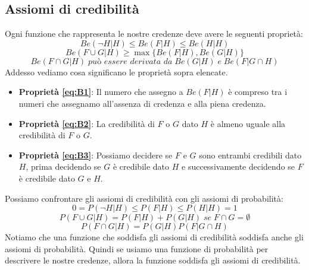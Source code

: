 \documentclass[../main.tex]{subfiles}
\begin{document}
\subsection{Assiomi di credibilità}
Ogni funzione che rappresenta le nostre credenze deve avere le seguenti proprietà:
\begin{equation}
    \label{eq:B1}
    Be(\lnot H|H) \leq Be(F|H) \leq Be(H|H)
\end{equation}
\begin{equation}
    \label{eq:B2}
    Be(F\cup G|H) \geq \max \{ Be(F|H),Be(G|H)\} 
\end{equation}
\begin{equation}
    \label{eq:B3}
    Be(F \cap G|H) \;\textit{può essere derivata da}\;  Be(G|H) \;\textit{e}\; Be(F|G \cap H)
\end{equation}
\hfill \break
Addesso vediamo cosa significano le proprietà sopra elencate.
\begin{itemize}
    \item \textbf{Proprietà \ref{eq:B1}}: Il numero che assegno a $Be(F|H)$ è compreso tra i numeri che assegnamo all'assenza di credenza e alla piena credenza.
    \item \textbf{Proprietà \ref{eq:B2}}: La credibilità di $F$ o $G$ dato $H$ è almeno uguale alla credibilità di $F$ o $G$.
    \item \textbf{Proprietà \ref{eq:B3}}: Possiamo decidere se $F$ e $G$ sono entrambi credibili dato $H$, prima decidendo se $G$ è credibile dato $H$ e successivamente decidendo se $F$ è credibile dato $G$ e $H$.
\end{itemize}
\hfill \break
Possiamo confrontare gli assiomi di credibilità con gli assiomi di probabilità:
\begin{equation}
    \label{eq:P1}
    0=P(\lnot H|H) \leq P(F|H) \leq P(H|H)=1
\end{equation}
\begin{equation}
    \label{eq:P2}
    P(F\cup G|H) = P(F|H)+P(G|H) \;\textit{se}\; F \cap G = \emptyset
\end{equation}
\begin{equation}
    \label{eq:P3}
    P(F \cap G|H) = P(G|H)P(F|G \cap H)
\end{equation}
\hfill \break
Notiamo che una funzione che soddisfa gli assiomi di credibilità soddisfa anche gli assiomi di probabilità. Quindi se usiamo una funzione di probabilità per descrivere le nostre credenze, allora la funzione soddisfa gli assiomi di credibilità.
\end{document}

